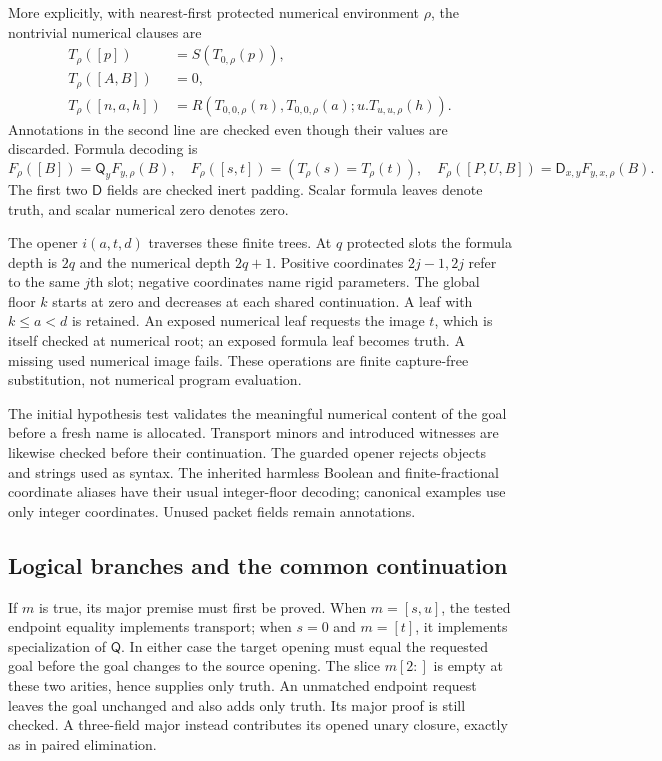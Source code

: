 \documentclass[11pt,letterpaper]{article}
\theoremstyle{definition}\newtheorem{definition}[theorem]{Definition}
\theoremstyle{remark}\newtheorem{remark}[theorem]{Remark}
\newcommand{\D}{\mathsf D}
\newcommand{\Q}{\mathsf Q}
\begin{document}
More explicitly, with nearest-first protected numerical environment
$\rho$, the nontrivial numerical clauses are
\[
\begin{aligned}
T_\rho([p])&=S(T_{0,\rho}(p)),\\
T_\rho([A,B])&=0,\\
T_\rho([n,a,h])&=
R(T_{0,0,\rho}(n),T_{0,0,\rho}(a);
        u.T_{u,u,\rho}(h)).
\end{aligned}
\]
Annotations in the second line are checked even though their values are
discarded. Formula decoding is
\[
F_\rho([B])=\Q_yF_{y,\rho}(B),\quad
F_\rho([s,t])=(T_\rho(s)=T_\rho(t)),\quad
F_\rho([P,U,B])=\D_{x,y}F_{y,x,\rho}(B).
\]
The first two $\D$ fields are checked inert padding. Scalar formula
leaves denote truth, and scalar numerical zero denotes zero.

The opener $i(a,t,d)$ traverses these finite trees. At $q$ protected
slots the formula depth is $2q$ and the numerical depth $2q+1$.
Positive coordinates $2j-1,2j$ refer to the same $j$th slot; negative
coordinates name rigid parameters. The global floor $k$ starts at zero
and decreases at each shared continuation. A leaf with $k\leq a<d$ is
retained. An exposed numerical leaf requests the image $t$, which is
itself checked at numerical root; an exposed formula leaf becomes truth.
A missing used numerical image fails. These operations are finite
capture-free substitution, not numerical program evaluation.

The initial hypothesis test validates the meaningful numerical content
of the goal before a fresh name is allocated. Transport minors and
introduced witnesses are likewise checked before their continuation.
The guarded opener rejects objects and strings used as syntax. The
inherited harmless Boolean and finite-fractional coordinate aliases
have their usual integer-floor decoding; canonical examples use only
integer coordinates. Unused packet fields remain annotations.

\subsection{Logical branches and the common continuation}

If $m$ is true, its major premise must first be proved. When
$m=[s,u]$, the tested endpoint equality implements transport; when
$s=0$ and $m=[t]$, it implements specialization of $\Q$.
In either case the target opening must equal the requested goal before
the goal changes to the source opening. The slice $m[2:]$ is empty at
these two arities, hence supplies only truth. An unmatched endpoint
request leaves the goal unchanged and also adds only truth. Its major
proof is still checked. A three-field major instead contributes its
opened unary closure, exactly as in paired elimination.
\end{document}
